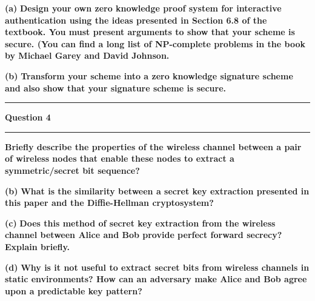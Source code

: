 \documentclass[11pt]{article}
\newcommand\question[2]{\vspace{.25in}\hrule\textbf{#1}\vspace{.5em}\hrule\vspace{.10in}}
\renewcommand\part[1]{\vspace{.10in}\textbf{(#1)}}
\begin{document}
\part{a} \textbf{Design your own zero knowledge proof system for interactive authentication using the ideas presented in Section 6.8 of the textbook. You must present arguments to show that your scheme is secure. (You can find a long list of NP-complete problems in the book by Michael Garey and David Johnson.}

\part{b} \textbf{Transform your scheme into a zero knowledge signature scheme and also show that your signature scheme is secure.}

\question{Question 4}

\part{a} \textbf{Briefly describe the properties of the wireless channel between a pair of wireless nodes that enable these nodes to extract a symmetric/secret bit sequence?}

\part{b} \textbf{What is the similarity between a secret key extraction presented in this paper and the Diffie-Hellman cryptosystem?}

\part{c} \textbf{Does this method of secret key extraction from the wireless channel between Alice and Bob provide perfect forward secrecy? Explain briefly.}

\part{d} \textbf{Why is it not useful to extract secret bits from wireless channels in static environments? How can an adversary make Alice and Bob agree upon a predictable key pattern?}
\end{document}
